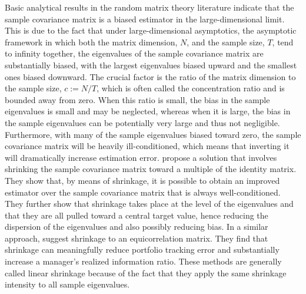 Basic analytical results in the random matrix theory literature indicate that the sample covariance matrix is a biased estimator in the large-dimensional limit. This is due to the fact that under large-dimensional asymptotics, the asymptotic framework in which both the matrix dimension, $N$, and the sample size, $T$, tend to infinity together, the eigenvalues of the sample covariance matrix are substantially biased, with the largest eigenvalues biased upward and the smallest ones biased downward. The crucial factor is the ratio of the matrix dimension to the sample size, $c := N/T$, which is often called the concentration ratio and is bounded away from zero. When this ratio is small, the bias in the sample eigenvalues is small and may be neglected, whereas when it is large, the bias in the sample eigenvalues can be potentially very large and thus not negligible. Furthermore, with many of the sample eigenvalues biased toward zero, the sample covariance matrix will be heavily ill-conditioned, which means that inverting it will dramatically increase estimation error. \textcite{LEDOITWOLF2004} propose a solution that involves shrinking the sample covariance matrix toward a multiple of the identity matrix. They show that, by means of shrinkage, it is possible to obtain an improved estimator over the sample covariance matrix that is always well-conditioned. They further show that shrinkage takes place at the level of the eigenvalues and that they are all pulled toward a central target value, hence reducing the dispersion of the eigenvalues and also possibly reducing bias. In a similar approach, \textcite{LEDOITWOLF2004_HONEY} suggest shrinkage to an equicorrelation matrix. They find that shrinkage can meaningfully reduce portfolio tracking error and substantially increase a manager's realized information ratio. These methods are generally called linear shrinkage because of the fact that they apply the same shrinkage intensity to all sample eigenvalues.

